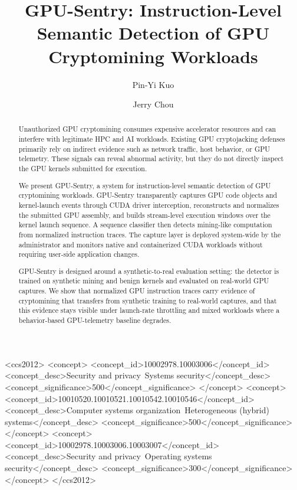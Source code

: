\documentclass[sigconf]{acmart}
\begin{document}
\fancyhead{}

\title{GPU-Sentry: Instruction-Level Semantic Detection of GPU Cryptomining Workloads}

\author{Pin-Yi Kuo}

\author{Jerry Chou}

\begin{abstract}
Unauthorized GPU cryptomining consumes expensive accelerator resources and can interfere with legitimate HPC and AI workloads. Existing GPU cryptojacking defenses primarily rely on indirect evidence such as network traffic, host behavior, or GPU telemetry. These signals can reveal abnormal activity, but they do not directly inspect the GPU kernels submitted for execution.

We present GPU-Sentry, a system for instruction-level semantic detection of GPU cryptomining workloads. GPU-Sentry transparently captures GPU code objects and kernel-launch events through CUDA driver interception, reconstructs and normalizes the submitted GPU assembly, and builds stream-level execution windows over the kernel launch sequence. A sequence classifier then detects mining-like computation from normalized instruction traces. The capture layer is deployed system-wide by the administrator and monitors native and containerized CUDA workloads without requiring user-side application changes.

GPU-Sentry is designed around a synthetic-to-real evaluation setting: the detector is trained on synthetic mining and benign kernels and evaluated on real-world GPU captures. We show that normalized GPU instruction traces carry evidence of cryptomining that transfers from synthetic training to real-world captures, and that this evidence stays visible under launch-rate throttling and mixed workloads where a behavior-based GPU-telemetry baseline degrades.
\end{abstract}

\begin{CCSXML}
<ccs2012>
   <concept>
       <concept_id>10002978.10003006</concept_id>
       <concept_desc>Security and privacy~Systems security</concept_desc>
       <concept_significance>500</concept_significance>
   </concept>
   <concept>
       <concept_id>10010520.10010521.10010542.10010546</concept_id>
       <concept_desc>Computer systems organization~Heterogeneous (hybrid) systems</concept_desc>
       <concept_significance>500</concept_significance>
   </concept>
   <concept>
       <concept_id>10002978.10003006.10003007</concept_id>
       <concept_desc>Security and privacy~Operating systems security</concept_desc>
       <concept_significance>300</concept_significance>
   </concept>
 </ccs2012>
\end{CCSXML}
\end{document}
